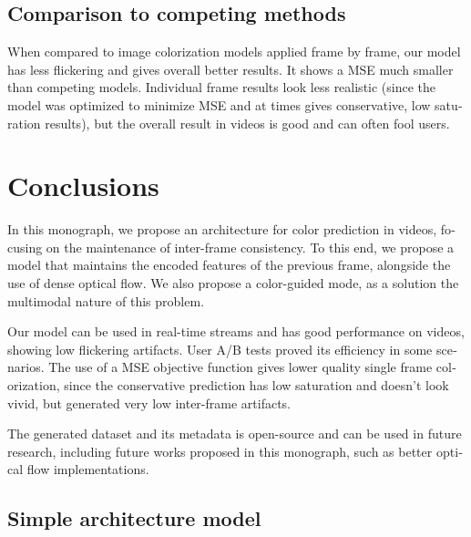 \documentclass[12pt,openright,oneside,a4paper,english, brazilian]{abntex2}
\begin{document}
\begin{otherlanguage}{english}
\section{Comparison to competing methods}
When compared to image colorization models applied frame by frame, our model has less flickering and gives overall better results. It shows a MSE much smaller than competing models. Individual frame results look less realistic (since the model was optimized to minimize MSE and at times gives conservative, low saturation results), but the overall result in videos is good and can often fool users.

\chapter{Conclusions}
In this monograph, we propose an architecture for color prediction in videos, focusing on the maintenance of inter-frame consistency. To this end, we propose a model that maintains the encoded features of the previous frame, alongside the use of dense optical flow. We also propose a color-guided mode, as a solution the multimodal nature of this problem.

Our model can be used in real-time streams and has good performance on videos, showing low flickering artifacts. User A/B tests proved its efficiency in some scenarios. The use of a MSE objective function gives lower quality single frame colorization, since the conservative prediction has low saturation and doesn't look vivid, but generated very low inter-frame artifacts.

The generated dataset and its metadata is open-source and can be used in future research, including future works proposed in this monograph, such as better optical flow implementations.




\begin{apendicesenv}
\chapter{Simple architecture model}


\end{apendicesenv}
\end{otherlanguage}
\end{document}
